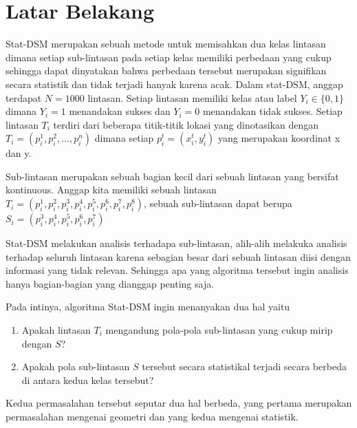 \documentclass[a4paper,twoside]{article}
\begin{document}
\section{Latar Belakang}
Stat-DSM merupakan sebuah metode untuk memisahkan dua kelas lintasan dimana setiap sub-lintasan pada setiap kelas memiliki perbedaan yang cukup sehingga dapat dinyatakan bahwa perbedaan tersebut merupakan signifikan secara statistik dan tidak terjadi hanyak karena acak.
Dalam stat-DSM, anggap terdapat $N = 1000$ lintasan.
Setiap lintasan memiliki kelas atau label $Y_i\in\{0,1\}$ dimana $Y_i = 1$ menandakan sukses dan $Y_i = 0$ menandakan tidak sukses.
Setiap lintasan $T_i$ terdiri dari beberapa titik-titik lokasi yang dinotasikan dengan $T_i = (p_i^1,p_i^2,...,p_i^n)$ dimana setiap $p_i^t = (x_i^t,y_i^t)$ yang merupakan koordinat x dan y.

Sub-lintasan merupakan sebuah bagian kecil dari sebuah lintasan yang bersifat kontinuous.
Anggap kita memiliki sebuah lintasan $T_i = (p_i^1,p_i^2,p_i^3,p_i^4,p_i^5,p_i^6,p_i^7,p_i^8)$, sebuah sub-lintasan dapat berupa $S_i = (p_i^3,p_i^4,p_i^5,p_i^6,p_i^7)$

Stat-DSM melakukan analisis terhadapa sub-lintasan, alih-alih melakuka analisis terhadap seluruh lintasan karena sebagian besar dari sebuah lintasan diisi dengan informasi yang tidak relevan.
Sehingga apa yang algoritma tersebut ingin analisis hanya bagian-bagian yang dianggap penting saja.

Pada intinya, algoritma Stat-DSM ingin menanyakan dua hal yaitu
\begin{enumerate}
	\item Apakah lintasan $T_i$ mengandung pola-pola sub-lintasan yang cukup mirip dengan $S$?
	\item Apakah pola sub-lintasan $S$ tersebut secara statistikal terjadi secara berbeda di antara kedua kelas tersebut? 
\end{enumerate}
Kedua permasalahan tersebut seputar dua hal berbeda, yang pertama merupakan permasalahan mengenai geometri dan yang kedua mengenai statistik.
\end{document}
